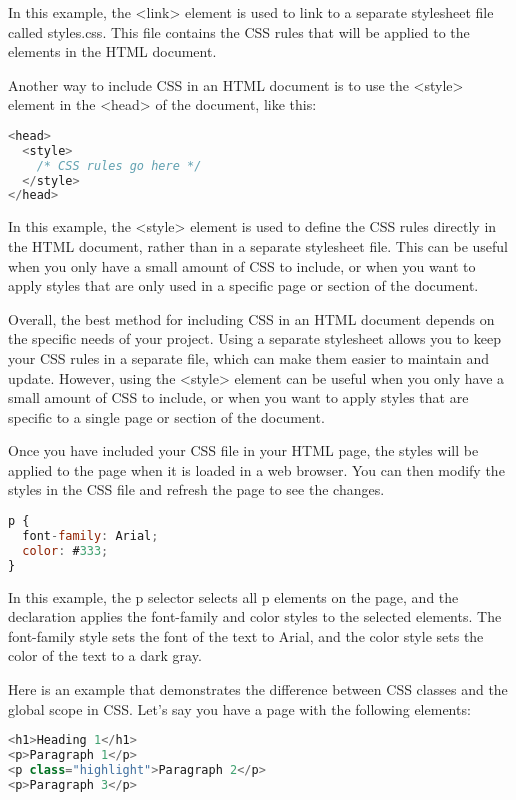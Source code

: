 {In this example, the <link> element is used to link to a separate stylesheet file called styles.css. This file contains the CSS rules that will be applied to the elements in the HTML document.

Another way to include CSS in an HTML document is to use the <style> element in the <head> of the document, like this:

\begin{lstlisting}[language=Javascript, caption=CSS styles included html]
<head>
  <style>
    /* CSS rules go here */
  </style>
</head>
\end{lstlisting}

In this example, the <style> element is used to define the CSS rules directly in the HTML document, rather than in a separate stylesheet file. This can be useful when you only have a small amount of CSS to include, or when you want to apply styles that are only used in a specific page or section of the document.

Overall, the best method for including CSS in an HTML document depends on the specific needs of your project. Using a separate stylesheet allows you to keep your CSS rules in a separate file, which can make them easier to maintain and update. However, using the <style> element can be useful when you only have a small amount of CSS to include, or when you want to apply styles that are specific to a single page or section of the document.

Once you have included your CSS file in your HTML page, the styles will be applied to the page when it is loaded in a web browser. You can then modify the styles in the CSS file and refresh the page to see the changes.

\begin{lstlisting}[language=Javascript, caption=Heading and Paragraph tag]
p {
  font-family: Arial;
  color: #333;
}
\end{lstlisting}


In this example, the p selector selects all p elements on the page, and the declaration applies the font-family and color styles to the selected elements. The font-family style sets the font of the text to Arial, and the color style sets the color of the text to a dark gray.


Here is an example that demonstrates the difference between CSS classes and the global scope in CSS. Let's say you have a page with the following elements:
\begin{lstlisting}[language=Javascript, nolol]
<h1>Heading 1</h1>
<p>Paragraph 1</p>
<p class="highlight">Paragraph 2</p>
<p>Paragraph 3</p>
\end{lstlisting}

}
